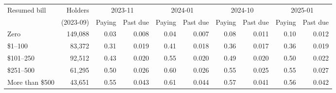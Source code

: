 \begin{tabular}{lrrrrrrrrr}
\toprule
Resumed bill & Holders & \multicolumn{2}{c}{2023-11} & \multicolumn{2}{c}{2024-01} & \multicolumn{2}{c}{2024-10} & \multicolumn{2}{c}{2025-01} \\
\cmidrule(lr){3-4}\cmidrule(lr){5-6}\cmidrule(lr){7-8}\cmidrule(lr){9-10}
 & (2023-09) & Paying & Past due & Paying & Past due & Paying & Past due & Paying & Past due \\
\midrule
Zero & 149,088 & 0.03 & 0.008 & 0.04 & 0.007 & 0.08 & 0.011 & 0.10 & 0.012 \\
\$1--100 & 83,372 & 0.31 & 0.019 & 0.41 & 0.018 & 0.36 & 0.017 & 0.36 & 0.019 \\
\$101--250 & 92,512 & 0.43 & 0.020 & 0.55 & 0.020 & 0.49 & 0.020 & 0.50 & 0.022 \\
\$251--500 & 61,295 & 0.50 & 0.026 & 0.60 & 0.026 & 0.55 & 0.025 & 0.55 & 0.027 \\
More than \$500 & 43,651 & 0.55 & 0.043 & 0.61 & 0.044 & 0.57 & 0.041 & 0.56 & 0.042 \\
\bottomrule
\end{tabular}
